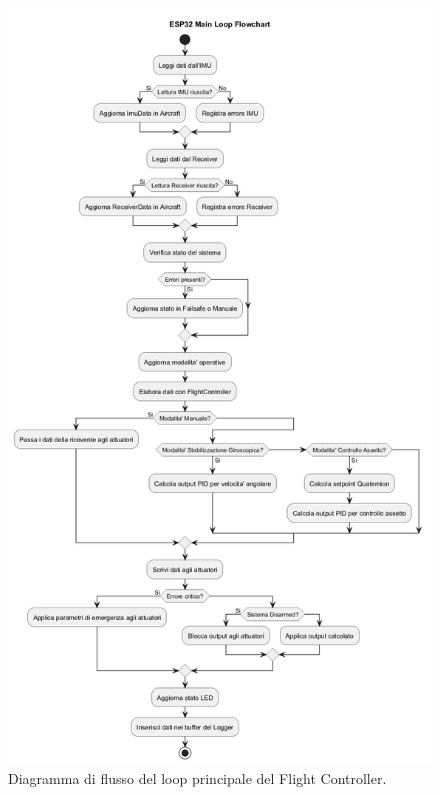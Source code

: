 \begin{figure}[h!]
    \centering
    \includegraphics[width=\textwidth]{diagrams/esp32_loop_flowchart.png}
    \caption{Diagramma di flusso del loop principale del Flight Controller.}
    \label{fig:esp32_loop_flowchart}
\end{figure}



